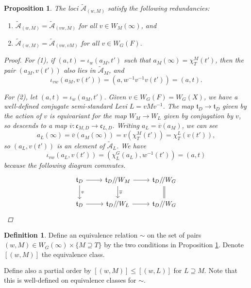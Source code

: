 \documentclass[openany]{amsbook}
\newtheorem{proposition}[theorem]{Proposition}
\theoremstyle{definition}
\newtheorem{definition}[theorem]{Definition}
\theoremstyle{remark}
\numberwithin{equation}{section}
\newcommand{\cA}{\mathcal{A}}
\newcommand{\ol}[1]{\overline{#1}}
\renewcommand{\-}{\operatorname{-}}
\newcommand{\ctA}{\widetilde{\cA}}
\newcommand{\ctAt}[2]{\ctA_{(#1,#2)}}
\newcommand{\ft}{\mathfrak{t}}
\newcommand{\fc}{\mathfrak{c}}
\newcommand{\gitq}{/\!/}
\begin{document}
\begin{proposition}\label{prop.wM.levi.equivs}
The loci $\ctAt{w}{M}$ satisfy the following redundancies:
    \begin{enumerate}
        \item $\ctAt{w}{M} = \ctAt{vw}{M}$ for all $v \in W_M(\infty)$, and
        \item $\ctAt{w}{M} = \ctAt{vw}{vM}$ for all $v \in W_G(F)$.
    \end{enumerate}
    \begin{proof}
        For (1), if $(a,t) = \iota_w(a_M, t')$ such that $a_M(\infty) = \chi_T^M(t')$, then the pair $(a_M, v(t'))$ also lies in $\ctA_M$, and 
        \[
            \iota_{vw}(a_M, v(t')) = (a, w^{-1} v^{-1} v (t')) = (a,t).
        \]

        For (2), let $(a,t) = \iota_w(a_M, t')$. Given $v \in W_G(F) = W_G(X)$, we have a well-defined conjugate semi-standard Levi $L = vMv^{-1}$. The map $\ft_D \to \ft_D$ given by the action of $v$ is equivariant for the map $W_M \to W_L$ given by conjugation by $v$, so descends to a map $ \ol{v} : \fc_{M,D} \to \fc_{L,D}$. Writing $a_L = \ol{v}(a_M)$, we can see
        \[
            a_L(\infty) = \ol{v}(a_M(\infty)) = v(\chi_T^M(t')) = \chi_T^L(v(t')),
        \]
        so $(a_L, v(t'))$ is an element of $\ctA_L$. We have
        \[
            \iota_{vw}(a_L, v(t')) = (\chi_L^G(a_L), w^{-1}(t')) = (a, t)
        \]
        because the following diagram commutes.
        $$
        \begin{tikzcd}[ampersand replacement=\&]
            \ft_D \ar[r] \ar[d, "v"] \& \ft_D\gitq W_M \ar[r] \ar[d, "\ol{v}"] \& \ft_D\gitq W_G \ar[d, equals]\\
            \ft_D \ar[r] \& \ft_D\gitq W_L \ar[r] \& \ft_D\gitq W_G
        \end{tikzcd}
        $$
    \end{proof}
\end{proposition}

\begin{definition}\label{def.wMpair.rels} Define an equivalence relation $\sim$ on the set of pairs $(w,M) \in W_G(\infty) \times \{M \supseteq T\}$ by the two conditions in Proposition \ref{prop.wM.levi.equivs}. Denote $[(w,M)]$ the equivalence class.

Define also a partial order by $[(w,M)] \le [(w, L)]$ for $L \supseteq M$. Note that this is well-defined on equivalence classes for $\sim$.


\end{definition}
\end{document}
